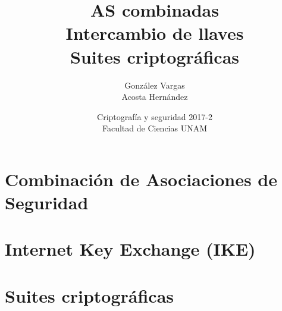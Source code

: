 \documentclass{beamer}
\begin{document}
\title{AS combinadas \\ Intercambio de llaves \\ Suites criptográficas}   
\author{González Vargas \\ Acosta Hernández} 
\date{Criptografía y seguridad 2017-2 \\ Facultad de Ciencias UNAM} 

\frame{\titlepage} 


\section{Combinación de Asociaciones de Seguridad}
\subsection{}


\section{Internet Key Exchange (IKE)} 
\subsection{}
\frame{\frametitle{}
  \begin{itemize}
  \item 
  \end{itemize}
}


\section{Suites criptográficas}
\subsection{}
\frame{\frametitle{}
}
\end{document}
